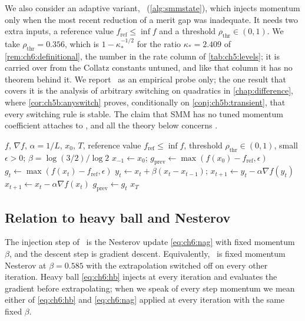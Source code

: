 We also consider an adaptive variant, \smmstate\ (\cref{alg:smmstate}), which injects momentum only when the most recent reduction of a merit gap was inadequate. It needs two extra inputs, a reference value $f_{\mathrm{ref}}\le\inf f$ and a threshold $\rho_{\mathrm{thr}}\in(0,1)$. We take $\rho_{\mathrm{thr}}=0.356$, which is $1-\kappa_\ast^{-1/2}$ for the ratio $\kappa_\ast=2.409$ of \cref{rem:ch6:definitional}, the number in the rate column of \cref{tab:ch5:levels}; it is carried over from the Collatz constants untuned, and like that column it has no theorem behind it. We report \smmstate\ as an empirical probe only; the one result that covers it is the analysis of arbitrary switching on quadratics in \cref{chap:difference}, where \cref{cor:ch5b:anyswitch} proves, conditionally on \cref{conj:ch5b:transient}, that every switching rule is stable. The claim that SMM has no tuned momentum coefficient attaches to \smmdet, and all the theory below concerns \smmdet.

\begin{algorithm}[t]
\caption{\smmstate: adaptive injection variant}
\label{alg:smmstate}
\begin{algorithmic}[1]
\Require $f$, $\nabla f$, $\alpha=1/L$, $x_0$, $T$, reference value
$f_{\mathrm{ref}}\le\inf f$, threshold $\rho_{\mathrm{thr}}\in(0,1)$, small
$\epsilon>0$; $\beta=\log(3/2)/\log 2$
\State $x_{-1}\gets x_0$; \quad $g_{\mathrm{prev}}\gets\max(f(x_0)-f_{\mathrm{ref}},\epsilon)$
  \State $g_t\gets\max(f(x_t)-f_{\mathrm{ref}},\epsilon)$ 
    \State $y_t\gets x_t+\beta(x_t-x_{t-1})$; \quad $x_{t+1}\gets y_t-\alpha\nabla f(y_t)$
  \Else
    \State $x_{t+1}\gets x_t-\alpha\nabla f(x_t)$ 
  \EndIf
  \State $g_{\mathrm{prev}}\gets g_t$
\EndFor
\State \Return $x_T$
\end{algorithmic}
\end{algorithm}

\subsection{Relation to heavy ball and Nesterov}

The injection step of \smmdet\ is the Nesterov update \eqref{eq:ch6:nag} with
fixed momentum $\beta$, and the descent step is gradient descent. Equivalently,
\smmdet\ is fixed momentum Nesterov at $\beta=0.585$ with the extrapolation
switched off on every other iteration. Heavy ball \eqref{eq:ch6:hb} injects at
every iteration and evaluates the gradient before extrapolating; when we speak
of every step momentum we mean either of \eqref{eq:ch6:hb} and
\eqref{eq:ch6:nag} applied at every iteration with the same fixed $\beta$.

